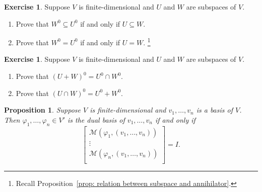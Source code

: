 \documentclass[colorlinks]{tufte-handout}
\theoremstyle{plain} %
\newtheorem{prop}[thm]{Proposition}
\theoremstyle{definition}
\newtheorem{exer}[thm]{Exercise}
\theoremstyle{remark}
\newcommand{\bra}[1]{\mathopen{}\left(#1\right)}
\newcommand{\cbra}[1]{\mathopen{}\left\{#1\right\}}
\renewcommand{\phi}{\varphi}
\newcommand{\M}{\mathcal{M}}
\begin{document}
\begin{exer}
	Suppose $V$ is finite-dimensional and $U$ and $W$ are subspaces of $V$.
	\begin{enumerate}
		\item Prove that $W^0\subseteq U^0$ if and only if $U\subseteq W$.
		\item Prove that $W^0=U^0$ if and only if $U=W$.%
    	\footnote{Recall Proposition~\ref{prop: relation between subspace and annihilator}.}
	\end{enumerate}
\end{exer}

\begin{exer}
	Suppose $V$ is finite-dimensional and $U$ and $W$ are subspaces of $V$.\
	\begin{enumerate}
		\item Prove that $\bra{U+W}^0=U^0\cap W^0$.
		\item Prove that $\bra{U\cap W}^0=U^0+W^0$.
	\end{enumerate}
\end{exer}

\begin{prop}\label{prop: matrix of dual basis}
	Suppose $V$ is finite-dimensional and $v_1,\dots,v_n$ is a basis of $V$. Then $\phi_1,\dots,\phi_n\in V'$ is the dual basis of $v_1,\dots,v_n$ if and only if
	\[\begin{bmatrix}
		\M(\phi_1,(v_1,\dots,v_n))\\
		\vdots\\
		\M(\phi_n,(v_1,\dots,v_n))\\
	\end{bmatrix}=I.\]
\end{prop}
\end{document}
